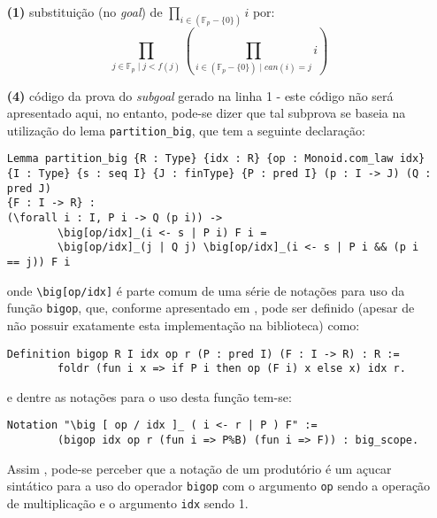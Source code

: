 \begin{enumerate}[label=\textbf{\roman*.}]
\begin{enumerate}
                \item[\textbf{(1)}] substituição (no \textit{goal}) de $\prod_{i \in (\mathbb{F}_p - \{0\})} i$ por:
                        \begin{equation*}
                        \prod_{j \in \mathbb{F}_p \mid j < f(j)} \left( \prod_{i \in (\mathbb{F}_p - \{0\}) \mid can(i)= j} i \right)
                        \end{equation*}

                \item[\textbf{(4)}] código da prova do \textit{subgoal} gerado na linha 1 - este código não será apresentado aqui, no entanto, pode-se dizer que tal subprova se baseia na utilização do lema \lstinline[language=coq]|partition_big|, que tem a seguinte declaração:
                        \begin{lstlisting}[language=coq,frame=single,tabsize=1]
Lemma partition_big {R : Type} {idx : R} {op : Monoid.com_law idx} 
{I : Type} {s : seq I} {J : finType} {P : pred I} (p : I -> J) (Q : pred J) 
{F : I -> R} :
(\forall i : I, P i -> Q (p i)) ->
        \big[op/idx]_(i <- s | P i) F i =
        \big[op/idx]_(j | Q j) \big[op/idx]_(i <- s | P i && (p i == j)) F i
                        \end{lstlisting}
                onde \lstinline[language=coq]|\big[op/idx]| é parte comum de uma série de notações para uso da função \lstinline[language=coq]|bigop|, que, conforme apresentado em \cite{assia_mahboubi_2022_7118596}, pode ser definido (apesar de não possuir exatamente esta implementação na biblioteca) como:
                        \begin{lstlisting}[language=coq,frame=single,tabsize=1]
Definition bigop R I idx op r (P : pred I) (F : I -> R) : R :=
        foldr (fun i x => if P i then op (F i) x else x) idx r.
                        \end{lstlisting}
                e dentre as notações para o uso desta função tem-se:
                        \begin{lstlisting}[language=coq,frame=single,tabsize=1]
Notation "\big [ op / idx ]_ ( i <- r | P ) F" :=
        (bigop idx op r (fun i => P%B) (fun i => F)) : big_scope.
                        \end{lstlisting}
                Assim , pode-se perceber que a notação de um produtório é um açucar sintático para a uso do operador \lstinline[language=coq]|bigop| com o argumento \lstinline[language=coq]|op| sendo a operação de multiplicação e o argumento \lstinline[language=coq]|idx| sendo 1. 
                

\end{enumerate}
\end{enumerate}
